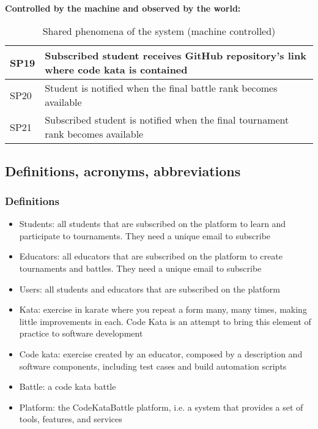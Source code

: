 \\
\textbf{Controlled by the machine and observed by the world:}
\begin{table}[h]
    \centering
    \begin{tabular}{|l|l|}
    \hline
        SP19 & Subscribed student receives GitHub repository's link where code kata is contained \\
    \hline
        SP20 & Student is notified when the final battle rank becomes available \\
    \hline
        SP21 & Subscribed student is notified when the final tournament rank becomes available \\
    \hline
    \end{tabular}
    \caption{Shared phenomena of the system (machine controlled)}
    \label{tab:goals}
\end{table}

\subsection{Definitions, acronyms, abbreviations}
\subsubsection{Definitions}
\begin{itemize}
    \item Students: all students that are subscribed on the platform to learn and participate to tournaments. They need a unique email to subscribe
    \item Educators: all educators that are subscribed on the platform to create tournaments and battles. They need a unique email to subscribe
    \item Users: all students and educators that are subscribed on the platform
    \item Kata: exercise in karate where you repeat a form many, many times, making little improvements in each. Code Kata is an attempt to bring this element of practice to software development
    \item Code kata: exercise created by an educator, composed by a description and software components, including test cases and build automation scripts
    \item Battle: a code kata battle
    \item Platform: the CodeKataBattle platform, i.e. a system that provides a set of tools, features, and services
\end{itemize}

